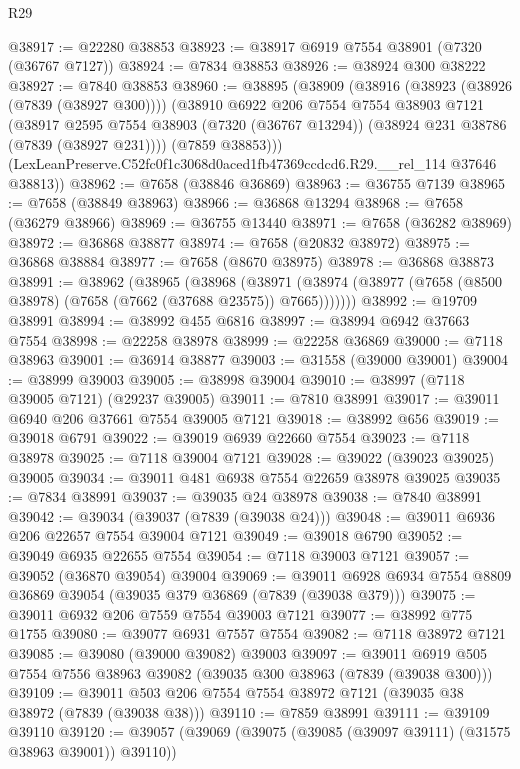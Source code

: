 \begin{lexlean}{R29}
\begin{coremodule}
@38917 := @22280 @38853
@38923 := @38917 @6919 @7554 @38901 (@7320 (@36767 @7127))
@38924 := @7834 @38853
@38926 := @38924 @300 @38222
@38927 := @7840 @38853
@38960 := @38895
    (@38909
      (@38916
        (@38923 (@38926 (@7839 (@38927 @300))))
        (@38910
          @6922
          @206
          @7554
          @7554
          @38903
          @7121
          (@38917
            @2595
            @7554
            @38903
            (@7320 (@36767 @13294))
            (@38924 @231 @38786 (@7839 (@38927 @231))))
          (@7859 @38853)))
      (LexLeanPreserve.C52fc0f1c3068d0aced1fb47369ccdcd6.R29.__rel_114 @37646 @38813))
@38962 := @7658 (@38846 @36869)
@38963 := @36755 @7139
@38965 := @7658 (@38849 @38963)
@38966 := @36868 @13294
@38968 := @7658 (@36279 @38966)
@38969 := @36755 @13440
@38971 := @7658 (@36282 @38969)
@38972 := @36868 @38877
@38974 := @7658 (@20832 @38972)
@38975 := @36868 @38884
@38977 := @7658 (@8670 @38975)
@38978 := @36868 @38873
@38991 := @38962
    (@38965
      (@38968
        (@38971 (@38974 (@38977 (@7658 (@8500 @38978) (@7658 (@7662 (@37688 @23575)) @7665)))))))
@38992 := @19709 @38991
@38994 := @38992 @455 @6816
@38997 := @38994 @6942 @37663 @7554
@38998 := @22258 @38978
@38999 := @22258 @36869
@39000 := @7118 @38963
@39001 := @36914 @38877
@39003 := @31558 (@39000 @39001)
@39004 := @38999 @39003
@39005 := @38998 @39004
@39010 := @38997 (@7118 @39005 @7121) (@29237 @39005)
@39011 := @7810 @38991
@39017 := @39011 @6940 @206 @37661 @7554 @39005 @7121
@39018 := @38992 @656
@39019 := @39018 @6791
@39022 := @39019 @6939 @22660 @7554
@39023 := @7118 @38978
@39025 := @7118 @39004 @7121
@39028 := @39022 (@39023 @39025) @39005
@39034 := @39011 @481 @6938 @7554 @22659 @38978 @39025
@39035 := @7834 @38991
@39037 := @39035 @24 @38978
@39038 := @7840 @38991
@39042 := @39034 (@39037 (@7839 (@39038 @24)))
@39048 := @39011 @6936 @206 @22657 @7554 @39004 @7121
@39049 := @39018 @6790
@39052 := @39049 @6935 @22655 @7554
@39054 := @7118 @39003 @7121
@39057 := @39052 (@36870 @39054) @39004
@39069 := @39011 @6928 @6934 @7554 @8809 @36869 @39054 (@39035 @379 @36869 (@7839 (@39038 @379)))
@39075 := @39011 @6932 @206 @7559 @7554 @39003 @7121
@39077 := @38992 @775 @1755
@39080 := @39077 @6931 @7557 @7554
@39082 := @7118 @38972 @7121
@39085 := @39080 (@39000 @39082) @39003
@39097 := @39011 @6919 @505 @7554 @7556 @38963 @39082 (@39035 @300 @38963 (@7839 (@39038 @300)))
@39109 := @39011 @503 @206 @7554 @7554 @38972 @7121 (@39035 @38 @38972 (@7839 (@39038 @38)))
@39110 := @7859 @38991
@39111 := @39109 @39110
@39120 := @39057 (@39069 (@39075 (@39085 (@39097 @39111) (@31575 @38963 @39001)) @39110))

\end{coremodule}
\end{lexlean}
